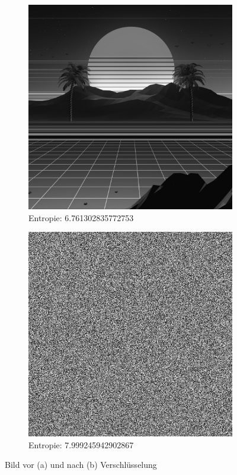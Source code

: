 \begin{figure}
	\centering

	\begin{subfigure}{0.35\textwidth}
		\includegraphics[width=\textwidth]{../1/3/gray_6.761302835772753_synthwave.jpg}
		\caption{Entropie: 6.761302835772753}
	\end{subfigure}
	\hfill
	\begin{subfigure}{0.35\textwidth}
		\includegraphics[width=\textwidth]{../1/3/encrypted_7.999245942902867_synthwave.jpg}
		\caption{Entropie: 7.999245942902867}
	\end{subfigure}

	\caption{Bild vor (a) und nach (b) Verschlüsselung}
	\label{fig:synthwave}
\end{figure}

